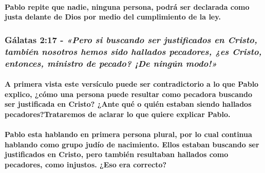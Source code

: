 \documentclass[11a pt,twoside]{article}
\newcommand{\scripture}[1]{%
  {\fontsize{12pt}{16pt}\selectfont\ScriptureFont\itshape #1}%
}
\let\oldsubsubsection\subsubsection
\renewcommand{\subsubsection}{\needspace{4\baselineskip}\oldsubsubsection}
\let\oldparagraph\paragraph
\renewcommand{\paragraph}{\needspace{3\baselineskip}\oldparagraph}
\begin{document}
\paragraph{Pablo repite que nadie, ninguna persona, podrá ser declarada
como justa delante de Dios por medio del cumplimiento de la
ley.}\label{pablo-repite-que-nadie-ninguna-persona-podruxe1-ser-declarada-como-justa-delante-de-dios-por-medio-del-cumplimiento-de-la-ley.}

\subsubsection{\texorpdfstring{Gálatas 2:17 -
\scripture{«Pero si buscando ser justificados en Cristo, también nosotros hemos sido hallados pecadores, ¿es Cristo, entonces, ministro de pecado? ¡De ningún modo!»}}{Gálatas 2:17 - }}\label{guxe1latas-217---pero-si-buscando-ser-justificados-en-cristo-tambiuxe9n-nosotros-hemos-sido-hallados-pecadores-es-cristo-entonces-ministro-de-pecado-de-ninguxfan-modo}

\paragraph{A primera vista este versículo puede ser contradictorio a lo
que Pablo explico, ¿cómo una persona puede resultar como pecadora
buscando ser justificada en Cristo? ¿Ante qué o quién estaban siendo
hallados pecadores?Trataremos de aclarar lo que quiere explicar
Pablo.}\label{a-primera-vista-este-versuxedculo-puede-ser-contradictorio-a-lo-que-pablo-explico-cuxf3mo-una-persona-puede-resultar-como-pecadora-buscando-ser-justificada-en-cristo-ante-quuxe9-o-quiuxe9n-estaban-siendo-hallados-pecadorestrataremos-de-aclarar-lo-que-quiere-explicar-pablo.}

\paragraph{Pablo esta hablando en primera persona plural, por lo cual
continua hablando como grupo judío de nacimiento. Ellos estaban buscando
ser justificados en Cristo, pero también resultaban hallados como
pecadores, como injustos. ¿Eso era
correcto?}\label{pablo-esta-hablando-en-primera-persona-plural-por-lo-cual-continua-hablando-como-grupo-juduxedo-de-nacimiento.-ellos-estaban-buscando-ser-justificados-en-cristo-pero-tambiuxe9n-resultaban-hallados-como-pecadores-como-injustos.-eso-era-correcto}
\end{document}
